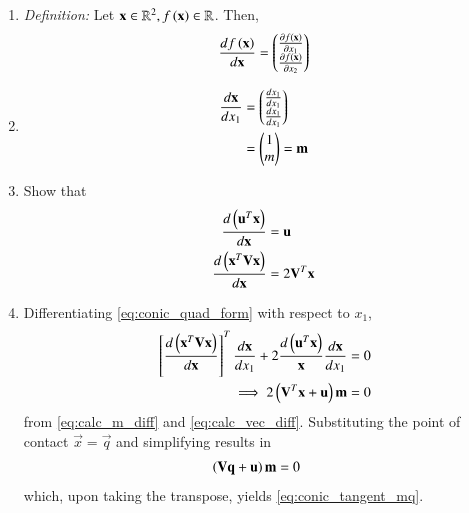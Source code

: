\renewcommand{\theequation}{\theenumi}
\begin{enumerate}[label=\thesubsection.\arabic*.,ref=\thesubsection.\theenumi]
\item {\em Definition: }Let $\mathbf{x} \in \mathbb{R}^2, f\left(\mathbf{x}\right) \in \mathbb{R}$.  Then, 
\begin{align}
\frac{df\left(\mathbf{x}\right)}{d\mathbf{x}} = \begin{pmatrix}\frac{\partial f(\mathbf{x})}{\partial x_1}\\\frac{\partial f(\mathbf{x})}{\partial x_2}\end{pmatrix}
\end{align}
\item 
\begin{align}
\begin{split}
\frac{d\mathbf{x}}{dx_1} &= \begin{pmatrix}\frac{dx_1}{dx_1} \\ \frac{dx_1}{dx_1}\end{pmatrix} 
\\
&= \begin{pmatrix}1\\m\end{pmatrix} = \mathbf{m}
\end{split}
\label{eq:calc_m_diff}
\end{align}
\item Show that 
\begin{align}
\begin{split}
\frac{d\left(\mathbf{u}^T\mathbf{x}\right)}{d\mathbf{x}} &= \mathbf{u}
\\
\frac{d\left(\mathbf{x}^T\mathbf{V}\mathbf{x}\right)}{d\mathbf{x}} &= 2\mathbf{V}^T\mathbf{x}
\end{split}
\label{eq:calc_vec_diff}
\end{align}
\item Differentiating \eqref{eq:conic_quad_form}
with respect to $x_1$,
%
\begin{align}
\label{eq:ellipse_tangent_der}
{}\left[\frac{d\left(\mathbf{x}^T\mathbf{V}\mathbf{x}\right)}{d\mathbf{x}}\right]^T\frac{d\mathbf{x}}{dx_1}
+2\frac{d\left(\mathbf{u}^T\mathbf{x}\right)}{\mathbf{x}} \frac{d\mathbf{x}}{dx_1}
= 0
\\
\implies 2\left(\mathbf{V}^T\mathbf{x}+\mathbf{u}\right)\mathbf{m}  = 0  
\end{align}
from \eqref{eq:calc_m_diff} and \eqref{eq:calc_vec_diff}.
%
Substituting  the point of contact $\vec{x} = \vec{q}$ and simplifying results in
\begin{align}
\left(\mathbf{V}\mathbf{q}+\mathbf{u}\right)\mathbf{m} & = 0 
\label{eq:ellipse_tangent_der_std}
\end{align}
%
which, upon taking the transpose, yields 
\eqref{eq:conic_tangent_mq}.
\end{enumerate}
